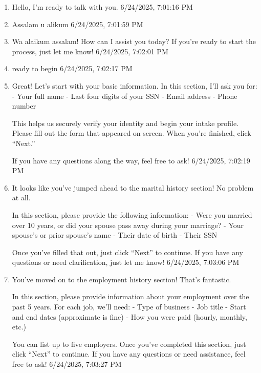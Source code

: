 \documentclass[a4paper,12pt]{article}
\begin{document}
\begin{enumerate}

    \item[AVATAR (text_mode)] Hello, I'm ready to talk with you. \hfill 6/24/2025, 7:01:16 PM


    \item[USER (text_mode)] Assalam u alikum \hfill 6/24/2025, 7:01:59 PM


    \item[AVATAR (text_mode)] Wa alaikum assalam! How can I assist you today? If you're ready to start the process, just let me know! \hfill 6/24/2025, 7:02:01 PM


    \item[USER (text_mode)] ready to begin \hfill 6/24/2025, 7:02:17 PM


    \item[AVATAR (text_mode)] Great! Let’s start with your basic information.  
In this section, I’ll ask you for:  
- Your full name  
- Last four digits of your SSN  
- Email address  
- Phone number  

This helps us securely verify your identity and begin your intake profile.  
Please fill out the form that appeared on screen. When you're finished, click “Next.” 

If you have any questions along the way, feel free to ask! \hfill 6/24/2025, 7:02:19 PM


    \item[AVATAR (text_mode)] It looks like you've jumped ahead to the marital history section! No problem at all. 

In this section, please provide the following information:  
- Were you married over 10 years, or did your spouse pass away during your marriage?  
- Your spouse’s or prior spouse’s name  
- Their date of birth  
- Their SSN  

Once you’ve filled that out, just click “Next” to continue. If you have any questions or need clarification, just let me know! \hfill 6/24/2025, 7:03:06 PM


    \item[AVATAR (text_mode)] You've moved on to the employment history section! That's fantastic. 

In this section, please provide information about your employment over the past 5 years. For each job, we’ll need:  
- Type of business  
- Job title  
- Start and end dates (approximate is fine)  
- How you were paid (hourly, monthly, etc.)  

You can list up to five employers. Once you've completed this section, just click “Next” to continue. If you have any questions or need assistance, feel free to ask! \hfill 6/24/2025, 7:03:27 PM



\end{enumerate}
\end{document}
